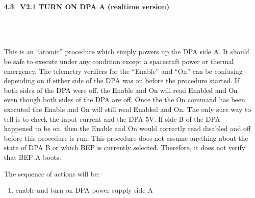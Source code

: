 \documentclass[11pt]{article}
\begin{document}
%
%
%
\newcommand{\be}{\begin{enumerate}}
\newcommand{\ee}{\end{enumerate}}
\newcommand{\bc}{\begin{center}}
\newcommand{\ec}{\end{center}}
\newcommand{\bi}{\begin{itemize}}
\newcommand{\ei}{\end{itemize}}
\newcommand{\bd}{\begin{description}}
\newcommand{\ed}{\end{description}}
\newcommand{\bt}{\begin{tabbing}}
\newcommand{\et}{\end{tabbing}}
\newcommand{\eg}{{\it e.g.~}}
\newcommand{\ie}{{\it i.e.~}}
\newcommand{\ul}{\underline}
\newcommand{\axaf}{{\em AXAF}}
\def\la{\hbox{\rlap{$<$}\lower0.5ex\hbox{$\sim$}\ }}


\large
\centerline {\bf 4.3\_V2.1 TURN ON DPA A (realtime version) }
\vspace{0.25in}

\normalsize
{}\\
 \\


 \\
\normalsize
This is an ``atomic'' procedure which simply powers up the DPA side A.
It should be safe to execute under any
condition except a spacecraft power or thermal emergency.
The telemetry verifiers for the ``Enable'' and ``On''  can be
confusing depending on if either side of the DPA was on before the
procedure started.  If both sides of the DPA were off, the Enable and
On will read Enabled and On even though both sides of the DPA are off.
Once the the On command has been executed the Enable and On will still
read Enabled and On.  The only sure way to tell is to check the input
current and the DPA 5V.  If side B of the DPA happened to be on, then
the Enable and On would correctly read disabled and off before this
procedure is run.  This procedure does not assume anything about the
state of DPA B or which BEP is currently selected.  Therefore, it does
not verify that BEP A boots.

\vspace{0.25in}
\noindent The sequence of actions will be:
\be
\item enable and turn on DPA power supply side A
\ee
\end{document}
